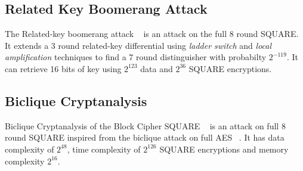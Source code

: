 \documentclass[preprint]{transcrypto}
\begin{document}
\subsection{Related Key Boomerang Attack}
The Related-key boomerang attack ~\cite{EPRINT:KooYeoSon10} is an attack on the full 8 round SQUARE. It extends a 3 round related-key differential using \textit{ladder switch} and \textit{local amplification} techniques to find a 7 round distinguisher with probabilty $2^{-119}$. It can retrieve 16 bits of key using $2^{123}$ data and $2^{36}$ SQUARE encryptions.

\subsection{Biclique Cryptanalysis}
Biclique Cryptanalysis of the Block Cipher SQUARE ~\cite{EPRINT:Mala11} is an attack on full 8 round SQUARE inspired from the biclique attack on full AES ~\cite{AC:BogKhoRec11}. It has data complexity of $2^{48}$, time complexity of $2^{126}$ SQUARE encryptions and memory complexity $2^{16}$.



\end{document}
